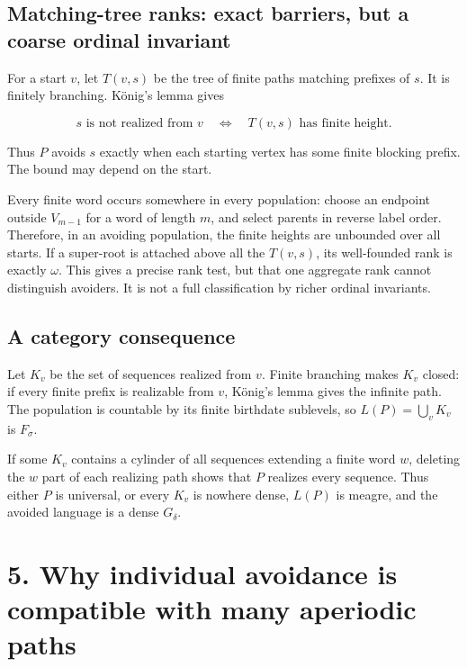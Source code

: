 \documentclass[
  11pt,
]{article}
\begin{document}
\subsection{Matching-tree ranks: exact barriers, but a coarse ordinal
invariant}\label{matching-tree-ranks-exact-barriers-but-a-coarse-ordinal-invariant}

For a start \(v\), let \(T(v,s)\) be the tree of finite paths matching
prefixes of \(s\). It is finitely branching. König's lemma gives

\[s\text{ is not realized from }v
\quad\Longleftrightarrow\quad T(v,s)\text{ has finite height}.\]

Thus \(P\) avoids \(s\) exactly when each starting vertex has some
finite blocking prefix. The bound may depend on the start.

Every finite word occurs somewhere in every population: choose an
endpoint outside \(V_{m-1}\) for a word of length \(m\), and select
parents in reverse label order. Therefore, in an avoiding population,
the finite heights are unbounded over all starts. If a super-root is
attached above all the \(T(v,s)\), its well-founded rank is exactly
\(\omega\). This gives a precise rank test, but that one aggregate rank
cannot distinguish avoiders. It is not a full classification by richer
ordinal invariants.

\subsection{A category consequence}\label{a-category-consequence}

Let \(K_v\) be the set of sequences realized from \(v\). Finite
branching makes \(K_v\) closed: if every finite prefix is realizable
from \(v\), König's lemma gives the infinite path. The population is
countable by its finite birthdate sublevels, so \(L(P)=\bigcup_vK_v\) is
\(F_\sigma\).

If some \(K_v\) contains a cylinder of all sequences extending a finite
word \(w\), deleting the \(w\) part of each realizing path shows that
\(P\) realizes every sequence. Thus either \(P\) is universal, or every
\(K_v\) is nowhere dense, \(L(P)\) is meagre, and the avoided language
is a dense \(G_\delta\).

\section{5. Why individual avoidance is compatible with many aperiodic
paths}\label{why-individual-avoidance-is-compatible-with-many-aperiodic-paths}
\end{document}

